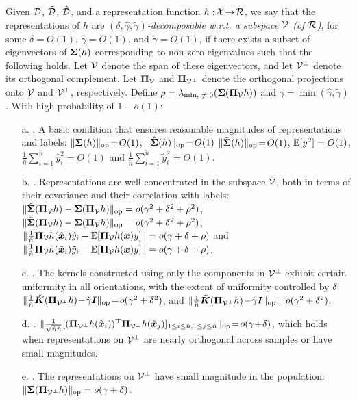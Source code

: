\begin{definition}\label{def: delta_decomp} 
Given ${\mathcal{D}}$, $\tilde{{\mathcal{D}}}$, $\hat{{\mathcal{D}}}$, and a representation function $h:\!{\mathcal{X}}\!\rightarrow\!{\mathcal{R}}$, we say that the representations of $h$ are \emph{$(\delta, \hat{\gamma}, \tilde{\gamma})$-decomposable w.r.t. a subspace ${\mathcal{V}}$ (of ${\mathcal{R}}$)}, for some $\delta\!=\!O(1)$,  $\hat{\gamma}\!=\!O(1)$, and $\tilde{\gamma}\!=\!O(1)$, if there exists a subset of eigenvectors of ${\bm{\Sigma}}(h)$ corresponding to non-zero eigenvalues such that the following holds. Let ${\mathcal{V}}$ denote the span of these eigenvectors, and let ${\mathcal{V}}^\perp$ denote its orthogonal complement. Let ${\bm{\Pi}}_{{\mathcal{V}}}$ and ${\bm{\Pi}}_{{\mathcal{V}}^\perp}$ denote the orthogonal projections onto ${\mathcal{V}}$ and ${\mathcal{V}}^\perp$, respectively. Define $\rho=\lambda_{\text{min, $\neq 0$}}( {\bm{\Sigma}}({\bm{\Pi}}_{{\mathcal{V}}}h)  )$ and $\gamma=\min( \hat{\gamma}, \tilde{\gamma} )$. With high probability of $1-o(1)$:
\begin{itemize}[leftmargin=*]
\item[a.] \bounded{}. A basic condition that ensures reasonable magnitudes of representations and labels: $\lVert {\bm{\Sigma}}(h) \rVert_{\mathrm{op}}\!=\!O(1)$, $\lVert \hat{{\bm{\Sigma}}}(h) \rVert_{\mathrm{op}}\!=\!O(1)$ $\lVert \tilde{{\bm{\Sigma}}}(h) \rVert_{\mathrm{op}}\!=\!O(1)$, $\mathbb{E}[y^2]=O(1)$, $\frac{1}{\hat{n}}\sum_{i=1}^{\hat{n}}\hat{y}_i^2\!=\!O(1)$ and $\frac{1}{\tilde{n}}\sum_{i=1}^{\tilde{n}}\tilde{y}_i^2 \!= \!O(1)$.
\item[b.] \conc{}. Representations are well-concentrated in the subspace ${\mathcal{V}}$, both in terms of their covariance and their correlation with labels:  $ \lVert  \hat{{\bm{\Sigma}}}({\bm{\Pi}}_{{\mathcal{V}}}h)-  {\bm{\Sigma}}({\bm{\Pi}}_{{\mathcal{V}}}h)   \rVert_{\mathrm{op}} = o(\gamma^2+\delta^2 + \rho^2 ) $, $ \lVert  \tilde{{\bm{\Sigma}}}({\bm{\Pi}}_{{\mathcal{V}}}h)-  {\bm{\Sigma}}({\bm{\Pi}}_{{\mathcal{V}}}h)   \rVert_{\mathrm{op}} = o(\gamma^2+\delta^2 + \rho^2 ) $, $\| \frac{1}{\hat{n}} {\bm{\Pi}}_{{\mathcal{V}}}h(\hat{{\bm{x}}}_i)\hat{y}_i -\mathbb{E}[ {\bm{\Pi}}_{{\mathcal{V}}}h({\bm{x}}) y]  \| = o(\gamma+\delta+\rho) $ and $\| \frac{1}{\tilde{n}} {\bm{\Pi}}_{{\mathcal{V}}}h(\tilde{{\bm{x}}}_i)\tilde{y}_i -\mathbb{E}[ {\bm{\Pi}}_{{\mathcal{V}}}h({\bm{x}}) y]  \| = o(\gamma+\delta+\rho) $.
\item[c.] \isotropy{}. The kernels constructed using only the components in ${\mathcal{V}}^\perp$ exhibit certain uniformity in all orientations, with the extent of uniformity controlled by $\delta$: $ \lVert \frac{1}{\hat{n}} \hat{{\bm{K}}}( {\bm{\Pi}}_{{\mathcal{V}}^\perp}h )\! -\!\hat{\gamma} {\bm{I}}  \rVert_{\mathrm{op}}\! =\! o(\gamma^2+\delta^2) $,  and $ \lVert \frac{1}{\tilde{n}} \tilde{{\bm{K}}}( {\bm{\Pi}}_{{\mathcal{V}}^\perp}h )\! -\!\tilde{\gamma} {\bm{I}}  \rVert_{\mathrm{op}}\! =\! o(\gamma^2+\delta^2) $. 
\item[d.] \smallin{}. $\lVert  \frac{1}{\sqrt{\hat{n}\tilde{n}}}[ ({\bm{\Pi}}_{{\mathcal{V}}^\perp}h(\hat{{\bm{x}}}_i))^\top {\bm{\Pi}}_{{\mathcal{V}}^\perp}h(\tilde{{\bm{x}}}_j)  ]_{1\leq i\leq\hat{n}, 1\leq j \leq \tilde{n}}  \rVert_{\mathrm{op}}\!=\! o(\gamma\!+\!\delta) $, which holds when representations on ${\mathcal{V}}^\perp$ are nearly orthogonal across samples or have small magnitudes.
\item[e.] \dimini{}. The representations on ${\mathcal{V}}^\perp$ have small magnitude in the population: $ \lVert  {\bm{\Sigma}}({\bm{\Pi}}_{{\mathcal{V}}^\perp}h)  \rVert_{\mathrm{op}}=o(\gamma+\delta)$. 
\end{itemize}
\end{definition}
